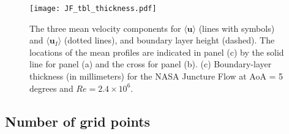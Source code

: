 \documentclass{ctr}
\begin{document}
%
\begin{figure}
\begin{center}
  \hspace{0.1cm}
\end{center}
\begin{center}
  \texttt{[image: JF\_tbl\_thickness.pdf]}
\end{center}
\caption{The three mean velocity components for $\langle
  \boldsymbol{u}\rangle$ (lines with symbols) and $\langle
  \boldsymbol{u}_I\rangle$ (dotted lines), and boundary layer height
  (dashed). The locations of the mean profiles are indicated in panel
  (c) by the solid line for panel (a) and the cross for panel (b). (c)
  Boundary-layer thickness (in millimeters) for the NASA Juncture Flow
  at AoA = 5 degrees and $Re= 2.4 \times
  10^6$. \label{fig:tbl_thickness}}
\end{figure}

\subsection{Number of grid points}\label{subsec:number}
\end{document}
